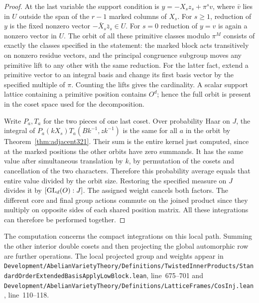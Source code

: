 \documentclass[a4paper,11pt]{article}
\theoremstyle{definition}
\theoremstyle{remark}
\newcommand{\srcloc}[2]{{\small\nolinkurl{#1.lean}}, line~#2}
\numberwithin{equation}{section}
\begin{document}
\begin{proof}
At the last variable the support condition is
\(y=-X_sz_s+\pi^s v\), where \(\bar v\) lies in \(U\)
outside the span of the \(r-1\) marked columns of \(X_s\).
For \(s\ge1\), reduction of \(y\) is the fixed nonzero
vector \(-\bar X_s\bar z_s\in U\). For \(s=0\) reduction
of \(y=v\) is again a nonzero vector in \(U\). The orbit
of all these primitive classes modulo \(\pi^M\) consists
of exactly the classes specified in the statement: the
marked block acts transitively on nonzero residue
vectors, and the principal congruence subgroup moves
any primitive lift to any other with the same reduction.
For the latter fact, extend a primitive vector to an
integral basis and change its first basis vector by the
specified multiple of \(\pi\). Counting the lifts gives
the cardinality. A scalar support lattice containing a
primitive position contains \(O^d\); hence the full orbit
is present in the coset space used for the decomposition.

Write \(P_a,T_a\) for the two pieces of one last coset.
Over probability Haar on \(J\), the integral of
\(P_a(kX_s)T_a(Bk^{-1},zk^{-1})\) is the same for
all \(a\) in the orbit by Theorem~\ref{thm:adjacent321}.
Their sum is the entire kernel just computed, since at
the marked positions the other orbits have zero summands.
It has the same value after simultaneous translation by
\(k\), by permutation of the cosets and cancellation of the
two characters. Therefore this probability average equals
that entire value divided by the orbit size. Restoring the
specified measure on \(J\) divides it by
\([{\rm GL}_d(O):J]\). The assigned weight cancels both
factors. The different core and final group actions commute
on the joined product since they multiply on opposite sides
of each shared position matrix. All these integrations can
therefore be performed together.
\end{proof}

The computation concerns the compact integrations on this
local path. Summing the other interior double cosets and
then projecting the global automorphic row are further
operations. The local projected group and weights appear in
\srcloc{Development/AbelianVarietyTheory/Definitions/TwistedInnerProducts/StandardOrderExtendedBasisApplyLowBlock}{675--701}
and \srcloc{Development/AbelianVarietyTheory/Definitions/LatticeFrames/CosInj}{110--118}.
\end{document}
